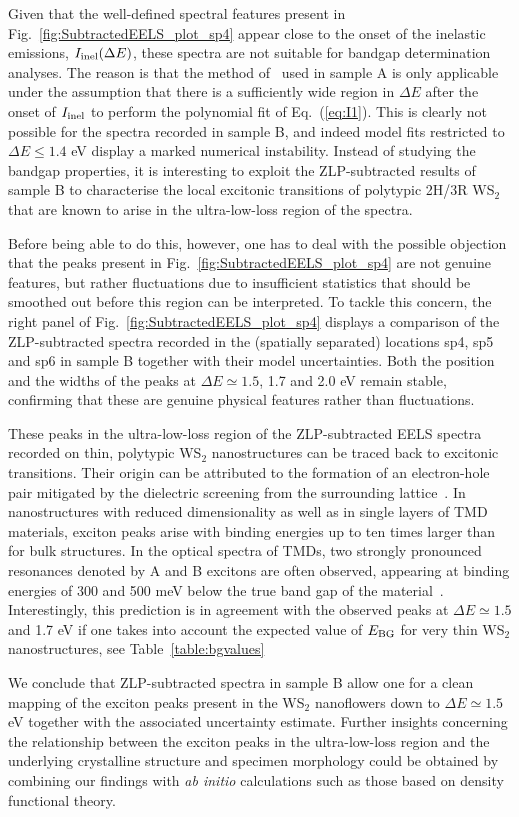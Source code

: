 Given that the
well-defined spectral features present in Fig.~\ref{fig:SubtractedEELS_plot_sp4}
appear close to the onset of the inelastic emissions, $I_{\rm inel}(\Delta E)$,
these spectra are not suitable for bandgap determination analyses.
%
The reason is that the method of~\cite{Rafferty:2000}
used in sample A is only applicable under the assumption that there is a sufficiently wide region in $\Delta E$
after the onset of $I_{\rm inel}$ to perform the polynomial fit of Eq.~(\ref{eq:I1}).
%
This is clearly not possible  for the spectra recorded in sample B, and indeed model fits restricted to $\Delta E\le 1.4$ eV
display a marked numerical instability.
%
Instead of studying the bandgap properties, it is interesting to exploit the ZLP-subtracted results of sample B
to characterise the local
excitonic transitions of polytypic 2H/3R WS$_2$
that are known to arise in the ultra-low-loss region of the spectra.

Before being able to do this, however, one has to deal with the possible objection
that the peaks present in Fig.~\ref{fig:SubtractedEELS_plot_sp4} are not
genuine features, but rather fluctuations due to insufficient statistics
that should be smoothed out before this region can be interpreted.
%
To tackle this concern, the right panel of Fig.~\ref{fig:SubtractedEELS_plot_sp4}
displays a
comparison of the ZLP-subtracted spectra recorded in the (spatially separated) locations sp4, sp5 and sp6
in sample B
together with their model uncertainties.
%
Both the position and the widths of the peaks at $\Delta E\simeq 1.5$,
1.7 and 2.0 eV remain stable, confirming that these
are genuine physical features rather than fluctuations.

These peaks in the ultra-low-loss region of the ZLP-subtracted EELS spectra recorded on thin, polytypic
WS$_2$ nanostructures can be traced back to excitonic transitions.
%
Their origin can be attributed to the formation of an electron-hole pair mitigated
by the dielectric screening from the surrounding lattice~\cite{Hanbicki:2016}.
%
In nanostructures with reduced dimensionality as well as in single layers of TMD materials,
exciton peaks arise with binding energies up to ten times larger than for bulk structures.
%
In the optical spectra of TMDs, two strongly pronounced resonances denoted by A and B
excitons are often observed, appearing at binding energies of 300 and
500 meV below the true band gap of the material~\cite{Karivaj:2019}.
%
Interestingly, this prediction is in agreement with the observed peaks at
$\Delta E\simeq 1.5$ and 1.7 eV if one takes into account the expected
value of $E_{\rm BG}$ for very thin  WS$_2$ nanostructures, see Table~\ref{table:bgvalues}

We  conclude that ZLP-subtracted spectra in sample B allow one for
a clean mapping of the exciton peaks present in the WS$_2$ nanoflowers
down to $\Delta E\simeq 1.5$ eV together with
the associated uncertainty estimate.
%
Further insights concerning the relationship between the exciton peaks in the ultra-low-loss region
and the underlying crystalline structure and specimen morphology could be obtained
by combining our findings with {\it ab initio} calculations such as those based on
density functional theory.
